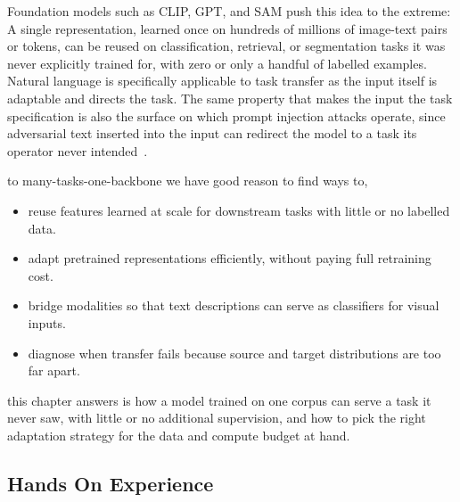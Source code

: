 Foundation models such as CLIP, GPT, and SAM push this idea to the extreme: A single representation, learned once on hundreds of millions of image-text pairs or tokens,
 can be reused on classification, retrieval, or segmentation tasks it was never explicitly trained
 for, with zero or only a handful of labelled examples.
 Natural language is specifically applicable to task transfer as the input
 itself is adaptable and directs the task. The same property that makes the input the task specification
 is also the surface on which prompt injection attacks operate, since adversarial text inserted into the input can redirect the
 model to a task its operator never intended~\cite{Greshake2023PromptInjection}.


 to many-tasks-one-backbone we have good reason to find ways to,
\begin{itemize}
    \item reuse features learned at scale for downstream tasks with little or no labelled data.
    \item adapt pretrained representations efficiently, without paying full retraining cost.
    \item bridge modalities so that text descriptions can serve as classifiers for visual inputs.
    \item diagnose when transfer fails because source and target distributions are too far apart.
\end{itemize}

 this chapter answers is how a model trained on one corpus can serve a task it never saw, with little or no additional supervision, and how to pick the right adaptation strategy for the data and compute budget at hand.



\newpage
\iffalse

\subsection{Hands On Experience}


